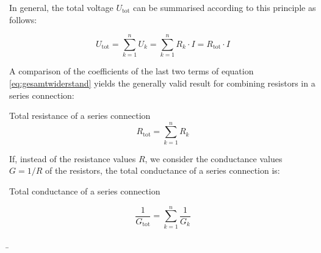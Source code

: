 \begin{frame}
{		In general, the total voltage $U_\mathrm{tot}$ can be summarised according to this principle as follows:
		
		\begin{equation}
			U_\mathrm{tot} = \sum_{k=1}^{n} U_k = \sum_{k=1}^{n} R_k \cdot I = R_\mathrm{tot} \cdot I
			\label{eq:gesamtwiderstand}
		\end{equation}
		
		A comparison of the coefficients of the last two terms of equation \ref{eq:gesamtwiderstand} yields the generally valid 
		result for combining resistors in a series connection:
		
		\begin{Key point}{Total resistance of a series connection}{}
			\begin{equation}
				R_\mathrm{tot} = \sum_{k=1}^{n} R_k
			\end{equation}
		\end{Key point}
		
		If, instead of the resistance values $R$, we consider the conductance values $G = 1/R$ of the resistors, the total conductance
        of a series connection is:

		
		
		\begin{Key point}{Total conductance of a series connection}{}
			
			
			\begin{equation}
				\frac{1}{G_\mathrm{tot}} = \sum_{k=1}^{n} \frac{1}{G_k}
			\end{equation}
			
			
			
			
		\end{Key point}
		
		
		
		
		
		
		
		
		
		
		
		
	}
	
	\b{
	
		\begin{columns}



\end{columns}}
\end{frame}
